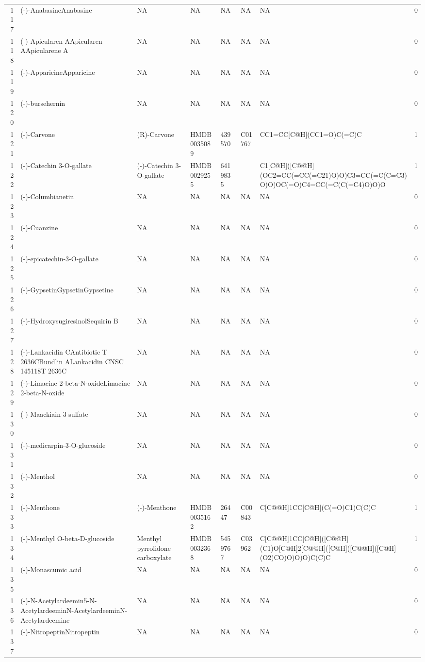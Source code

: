 \documentclass[a4paper]{article}
\begin{document}
\begin{longtable}{rlllllll}
  117 & (-)-AnabasineAnabasine & NA & NA & NA & NA & NA & 0 \\ 
  118 & (-)-Apicularen AApicularen AApicularene A & NA & NA & NA & NA & NA & 0 \\ 
  119 & (-)-ApparicineApparicine & NA & NA & NA & NA & NA & 0 \\ 
  120 & (-)-bursehernin & NA & NA & NA & NA & NA & 0 \\ 
  121 & (-)-Carvone & (R)-Carvone & HMDB0035089 & 439570 & C01767 & CC1=CC[C@H](CC1=O)C(=C)C & 1 \\ 
  122 & (-)-Catechin 3-O-gallate & (-)-Catechin 3-O-gallate & HMDB0029255 & 6419835 &  & C1[C@H]([C@@H](OC2=CC(=CC(=C21)O)O)C3=CC(=C(C=C3)O)O)OC(=O)C4=CC(=C(C(=C4)O)O)O & 1 \\ 
  123 & (-)-Columbianetin & NA & NA & NA & NA & NA & 0 \\ 
  124 & (-)-Cuanzine & NA & NA & NA & NA & NA & 0 \\ 
  125 & (-)-epicatechin-3-O-gallate & NA & NA & NA & NA & NA & 0 \\ 
  126 & (-)-GypsetinGypsetinGypsetine & NA & NA & NA & NA & NA & 0 \\ 
  127 & (-)-HydroxysugiresinolSequirin B & NA & NA & NA & NA & NA & 0 \\ 
  128 & (-)-Lankacidin CAntibiotic T 2636CBundlin ALankacidin CNSC 145118T 2636C & NA & NA & NA & NA & NA & 0 \\ 
  129 & (-)-Limacine 2-beta-N-oxideLimacine 2-beta-N-oxide & NA & NA & NA & NA & NA & 0 \\ 
  130 & (-)-Maackiain 3-sulfate & NA & NA & NA & NA & NA & 0 \\ 
  131 & (-)-medicarpin-3-O-glucoside & NA & NA & NA & NA & NA & 0 \\ 
  132 & (-)-Menthol & NA & NA & NA & NA & NA & 0 \\ 
  133 & (-)-Menthone & (-)-Menthone & HMDB0035162 & 26447 & C00843 & C[C@@H]1CC[C@H](C(=O)C1)C(C)C & 1 \\ 
  134 & (-)-Menthyl O-beta-D-glucoside & Menthyl pyrrolidone carboxylate & HMDB0032368 & 5459767 & C03962 & C[C@@H]1CC[C@H]([C@@H](C1)O[C@H]2[C@@H]([C@H]([C@@H]([C@H](O2)CO)O)O)O)C(C)C & 1 \\ 
  135 & (-)-Monascumic acid & NA & NA & NA & NA & NA & 0 \\ 
  136 & (-)-N-Acetylardeemin5-N-AcetylardeeminN-AcetylardeeminN-Acetylardeemine & NA & NA & NA & NA & NA & 0 \\ 
  137 & (-)-NitropeptinNitropeptin & NA & NA & NA & NA & NA & 0 \\ 

\end{longtable}
\end{document}
